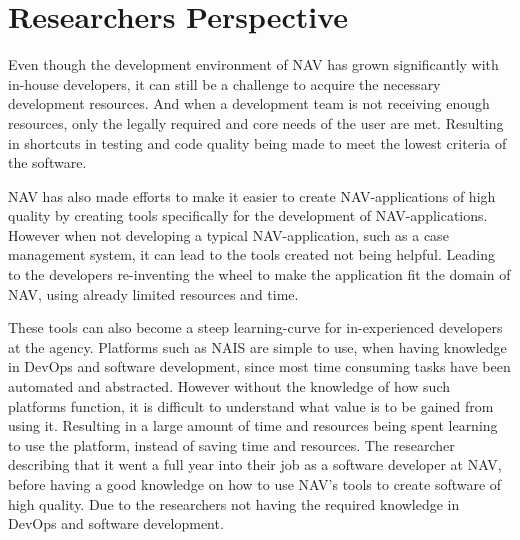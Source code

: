 


\section{Researchers Perspective}
Even though the development environment of NAV has grown significantly with in-house developers, it can still be a challenge to acquire the necessary development resources. And when a development team is not receiving enough resources, only the legally required and core needs of the user are met. Resulting in shortcuts in testing and code quality being made to meet the lowest criteria of the software.

NAV has also made efforts to make it easier to create NAV-applications of high quality by creating tools specifically for the development of NAV-applications. However when not developing a typical NAV-application, such as a case management system, it can lead to the tools created not being helpful. Leading to the developers re-inventing the wheel to make the application fit the domain of NAV, using already limited resources and time.

These tools can also become a steep learning-curve for in-experienced developers at the agency. Platforms such as NAIS are simple to use, when having knowledge in DevOps and software development, since most time consuming tasks have been automated and abstracted. However without the knowledge of how such platforms function, it is difficult to understand what value is to be gained from using it. Resulting in a large amount of time and resources being spent learning to use the platform, instead of saving time and resources. The researcher describing that it went a full year into their job as a software developer at NAV, before having a good knowledge on how to use NAV's tools to create software of high quality. Due to the researchers not having the required knowledge in DevOps and software development. 

